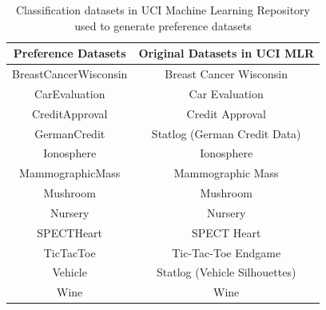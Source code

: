 
\begin{table}
        \centering
        \small
        \caption{Classification datasets in UCI Machine Learning Repository 
								 used to generate preference datasets}
        \begin{tabular}{ |c||c| }
                \hline
                Preference Datasets    & Original Datasets in UCI MLR \\
                \hline \hline
                BreastCancerWisconsin  & Breast Cancer Wisconsin \\
                \hline
                CarEvaluation          & Car Evaluation \\
                \hline
                CreditApproval         & Credit Approval \\
                \hline
                GermanCredit           & Statlog (German Credit Data) \\
                \hline
                Ionosphere             & Ionosphere \\
                \hline
                MammographicMass       & Mammographic Mass \\
                \hline
                Mushroom               & Mushroom \\
                \hline
                Nursery                & Nursery \\
                \hline
                SPECTHeart             & SPECT Heart \\
                \hline
                TicTacToe              & Tic-Tac-Toe Endgame \\
                \hline
                Vehicle                & Statlog (Vehicle Silhouettes) \\
                \hline
                Wine                   & Wine \\
                \hline
        \end{tabular}
        \label{tbl:class}
\end{table}


